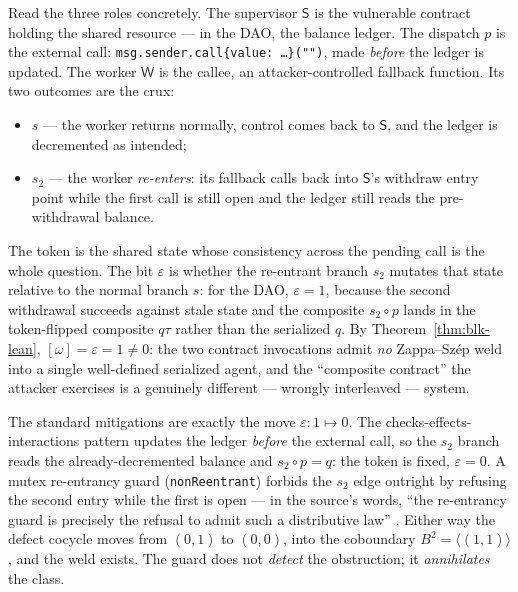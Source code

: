 Read the three roles concretely. The supervisor $\mathsf S$ is the vulnerable contract
holding the shared resource --- in the DAO, the balance ledger. The dispatch $p$ is the
external call: \texttt{msg.sender.call\{value: \ldots\}("")}, made \emph{before} the
ledger is updated. The worker $\mathsf W$ is the callee, an attacker-controlled fallback
function. Its two outcomes are the crux:
\begin{itemize}
\item $s$ --- the worker returns normally, control comes back to $\mathsf S$, and the ledger
  is decremented as intended;
\item $s_2$ --- the worker \emph{re-enters}: its fallback calls back into $\mathsf S$'s
  withdraw entry point while the first call is still open and the ledger still reads the
  pre-withdrawal balance.
\end{itemize}
The token is the shared state whose consistency across the pending call is the whole
question. The bit $\varepsilon$ is whether the re-entrant branch $s_2$ mutates that state
relative to the normal branch $s$: for the DAO, $\varepsilon=1$, because the second
withdrawal succeeds against stale state and the composite $s_2\circ p$ lands in the
token-flipped composite $q\tau$ rather than the serialized $q$. By
Theorem~\ref{thm:blk-lean}, $[\omega]=\varepsilon=1\neq 0$: the two contract invocations
admit \emph{no} Zappa--Sz\'ep weld into a single well-defined serialized agent, and the
``composite contract'' the attacker exercises is a genuinely different --- wrongly
interleaved --- system.

\begin{remark}
The standard mitigations are exactly the move $\varepsilon:1\mapsto 0$. The
checks-effects-interactions pattern updates the ledger \emph{before} the external call, so
the $s_2$ branch reads the already-decremented balance and $s_2\circ p=q$: the token is
fixed, $\varepsilon=0$. A mutex re-entrancy guard (\texttt{nonReentrant}) forbids the $s_2$
edge outright by refusing the second entry while the first is open --- in the source's
words, ``the re-entrancy guard is precisely the refusal to admit such a distributive law''
\cite{macbeth-reduction}. Either way the defect cocycle moves from $(0,1)$ to $(0,0)$, into
the coboundary $B^2=\langle(1,1)\rangle$, and the weld exists. The guard does not
\emph{detect} the obstruction; it \emph{annihilates} the class.
\end{remark}

